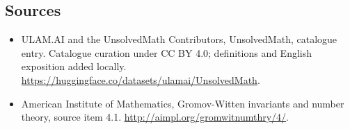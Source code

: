 \documentclass[11pt]{article}
\begin{document}
\subsection{Sources}
\begin{itemize}
\item[\hypertarget{source:statement:1}{S1}] ULAM.AI and the UnsolvedMath Contributors, UnsolvedMath, catalogue entry. Catalogue curation under CC BY 4.0; definitions and English exposition added locally.
\url{https://huggingface.co/datasets/ulamai/UnsolvedMath}.
\item[\hypertarget{source:statement:2}{S2}] American Institute of Mathematics, Gromov-Witten invariants and number theory, source item 4.1.
\url{http://aimpl.org/gromwitnumthry/4/}.
\end{itemize}
\label{end:statement}
\end{document}
